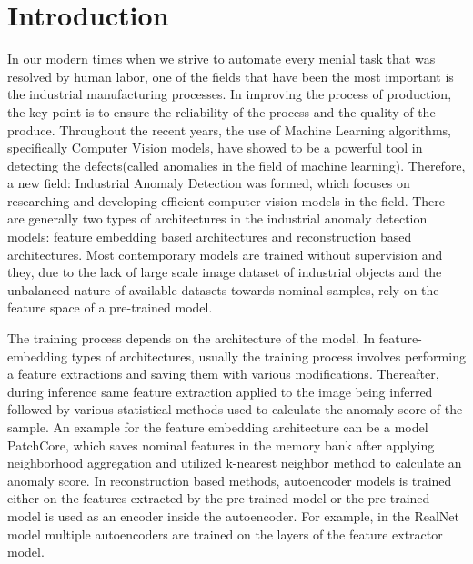 \chapter{Introduction}
\label{chapter:intro}

In our modern times when we strive to automate every menial task that was resolved by human labor, one of the fields that have been the most important is the industrial manufacturing processes. In improving the process of production, the key point is to ensure the reliability of the process and the quality of the produce. Throughout the recent years, the use of Machine Learning algorithms, specifically Computer Vision models, have showed to be a powerful tool in detecting the defects(called anomalies in the field of machine learning). Therefore, a new field: Industrial Anomaly Detection was formed, which focuses on researching and developing efficient computer vision models in the field. There are generally two types of architectures in the industrial anomaly detection models: feature embedding based architectures and reconstruction based architectures. Most contemporary models are trained without supervision and they, due to the lack of large scale image dataset of industrial objects and the unbalanced nature of available datasets towards nominal samples, rely on the feature space of a pre-trained model.

The training process depends on the architecture of the model. In feature-embedding types of architectures, usually the training process involves performing a feature extractions and saving them with various modifications. Thereafter, during inference same feature extraction applied to the image being inferred followed by various statistical methods used to calculate the anomaly score of the sample. An example for the feature embedding architecture can be a model PatchCore, which saves nominal features in the memory bank after applying neighborhood aggregation and utilized k-nearest neighbor method to calculate an anomaly score. In reconstruction based methods, autoencoder models is trained either on the features extracted by the pre-trained model or the pre-trained model is used as an encoder inside the autoencoder. For example, in the RealNet model multiple autoencoders are trained on the layers of the feature extractor model. 

